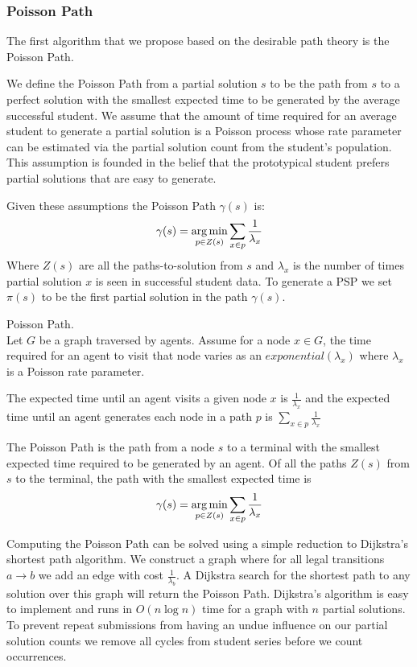 \subsubsection{Poisson Path}

The first algorithm that we propose based on the desirable path theory is the Poisson Path.

We define the Poisson Path from a partial solution $s$ to be the path from $s$ to a perfect solution with the smallest expected time to be generated by the average successful student. We assume that the amount of time required for an average student to generate a partial solution is a Poisson process whose rate parameter can be estimated via the partial solution count from the student's population. This assumption is founded in the belief that the prototypical student prefers partial solutions that are easy to generate.

Given these assumptions the Poisson Path $\gamma(s)$ is:
\begin{align*}
\gamma(s)=\operatorname*{arg\,min}_{p \in Z(s)}{\sum_{x \in p}{\frac{1}{\lambda_x}}}
\end{align*}
Where $Z(s)$ are all the paths-to-solution from $s$ and $\lambda_x$ is the number of times partial solution $x$ is seen in successful student data. To generate a PSP we set $\pi(s)$ to be the first partial solution in the path $\gamma(s)$. 



\begin{defo}
Poisson Path. \\ 
Let $G$ be a graph traversed by agents. Assume for a node $x \in G$, the time required for an agent to visit that node varies as an $exponential(\lambda_x)$ where $\lambda_x$ is a Poisson rate parameter. 

The expected time until an agent visits a given node $x$ is $\frac{1}{\lambda_x}$ and the expected time until an agent generates each node in a path $p$ is 
$\sum_{x \in p}{\frac{1}{\lambda_x}}$


The Poisson Path is the path from a node $s$ to a terminal with the smallest expected time required to be generated by an agent. Of all the paths $Z(s)$ from $s$ to the terminal, the path with the smallest expected time is 
\begin{align*}
\gamma(s)=\operatorname*{arg\,min}_{p \in Z(s)}{\sum_{x \in p}{\frac{1}{\lambda_x}}}
\end{align*}
\label{pcpDef}
\end{defo}

Computing the Poisson Path can be solved using a simple reduction to Dijkstra's shortest path algorithm. We construct a graph where for all legal transitions $a \rightarrow b$ we add an edge with cost $\frac{1}{\lambda_b}$. A Dijkstra search for the shortest path to any solution over this graph will return the Poisson Path. Dijkstra's algorithm is easy to implement and runs in $O(n\log n)$ time for a graph with $n$ partial solutions. To prevent repeat submissions from having an undue influence on our partial solution counts we remove all cycles from student series before we count occurrences.


